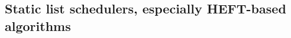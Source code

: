 \documentclass[conference]{IEEEtran}
\newcommand{\skug}[1]{{\color{blue}[SK: #1]}}
\newcommand{\hmey}[1]{{\color{red}[HM: #1]}}
\begin{document}
%
%
%


    \subsection{Static list schedulers, especially HEFT-based algorithms}
\end{document}

